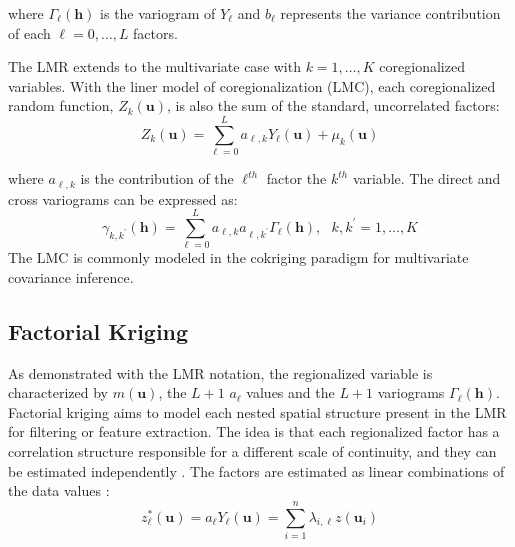 \lowercase{Where} $\Gamma_{\ell}(\mathbf{h})$ is the variogram of $Y_{\ell}$ and $b_{\ell}$ represents the variance contribution of each $\ell=0,\dots,L$ factors.

The LMR extends to the multivariate case with $k=1,\dots,K$ coregionalized variables. With the liner model of coregionalization (LMC), each coregionalized random function, $Z_{k}(\mathbf{u})$, is also the sum of the standard, uncorrelated factors:
\begin{equation*}
    Z_{k}(\mathbf{u}) = \sum_{\ell=0}^{L} a_{\ell, k} Y_{\ell}(\mathbf{u}) + \mu_{k}(\mathbf{u})
\end{equation*}

\lowercase{Where} $a_{\ell, k}$ is the contribution of the $\ell^{th}$ factor the $k^{th}$ variable. The direct and cross variograms can be expressed as:
\begin{equation*}
    \gamma_{k,k^{\prime}}(\mathbf{h}) = \sum_{\ell=0}^{L} a_{\ell, k} a_{\ell, k^{\prime}} \Gamma_{\ell}(\mathbf{h}), \ \ \ k,k^{\prime} = 1,\dots,K
\end{equation*}
The LMC is commonly modeled in the cokriging paradigm for multivariate covariance inference.

\subsection{Factorial Kriging}
\label{subsec:01factorial}

As demonstrated with the LMR notation, the regionalized variable is characterized by $m(\mathbf{u})$, the $L + 1$ $a_{\ell}$ values and the $L + 1$ variograms $\Gamma_{\ell}(\mathbf{h})$. Factorial kriging aims to model each nested spatial structure present in the LMR for filtering or feature extraction. The idea is that each regionalized factor has a correlation structure responsible for a different scale of continuity, and they can be estimated independently \citep{matheron1982factorial}. The factors are estimated as linear combinations of the data values \cite{deutsch2007recall}:
\begin{equation*}
    z_{\ell}^{*}(\mathbf{u}) = a_{\ell} Y_{\ell}(\mathbf{u}) = \sum_{i=1}^{n} \lambda_{i, \ell} z(\mathbf{u}_{i})
\end{equation*}


